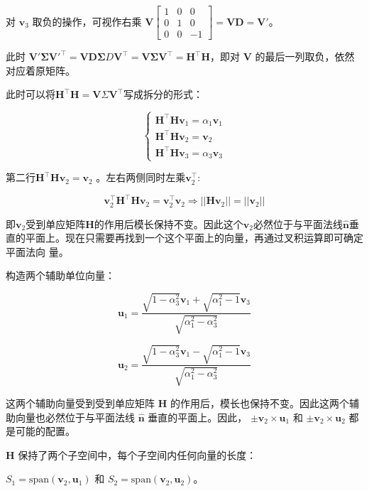 \documentclass{article}
\begin{document}
对 $\mathbf{v}_3$ 取负的操作，可视作右乘 $\mathbf{V}\begin{bmatrix}1&0&0\\0&1&0\\0&0&-1\end{bmatrix}=\mathbf{VD}=\mathbf{V'}$。

此时 $\mathbf{V'}\mathbf{\Sigma}\mathbf{V'}^\top=\mathbf{VD}\mathbf{\Sigma}D\mathbf{V}^\top=\mathbf{V}\mathbf{\Sigma}\mathbf{V}^\top=\mathbf{H}^\top\mathbf{H}$，即对 $\mathbf{V}$ 的最后一列取负，依然对应着原矩阵。

此时可以将$\mathbf{H}^\top\mathbf{H}=\mathbf{V}\Sigma\mathbf{V}^\top$写成拆分的形式：

$$\begin{cases}\mathbf{H}^\top\mathbf{H}\mathbf{v}_1=\alpha_1\mathbf{v}_1\\\mathbf{H}^\top\mathbf{H}\mathbf{v}_2=\mathbf{v}_2\\\mathbf{H}^\top\mathbf{H}\mathbf{v}_3=\alpha_3\mathbf{v}_3\end{cases}$$

第二行$\mathbf{H}^\top\mathbf{H}\mathbf{v}_2=\mathbf{v}_2$ 。左右两侧同时左乘$\mathbf{v}_2^\top:$

$$\mathbf{v}_2^\top\mathbf{H}^\top\mathbf{H}\mathbf{v}_2=\mathbf{v}_2^\top\mathbf{v}_2\Rightarrow||\mathbf{H}\mathbf{v}_2||=||\mathbf{v}_2||$$

即$\mathbf{v}_{2}$受到单应矩阵$\mathbf{H}$的作用后模长保持不变。因此这个$\mathbf{v}_{2}$必然位于与平面法线$\hat{\mathbf{n}}$垂直的平面上。现在只需要再找到一个这个平面上的向量，再通过叉积运算即可确定平面法向
量。

构造两个辅助单位向量：

 $$
\mathbf{u}_{1}=\frac{\sqrt{1-\alpha_{3}^{2}}\mathbf{v}_{1}+\sqrt{\alpha_{1}^{2}-1}\mathbf{v}_{3}}{\sqrt{\alpha_{1}^{2}-\alpha_{3}^{2}}} $$

$$
\mathbf{u}_{2}=\frac{\sqrt{1-\alpha_{3}^{2}}\mathbf{v}_{1}-\sqrt{\alpha_{1}^{2}-1}\mathbf{v}_{3}}{\sqrt{\alpha_{1}^{2}-\alpha_{3}^{2}}}
$$

这两个辅助向量受到受到单应矩阵 $\mathbf{H}$ 的作用后，模长也保持不变。因此这两个辅助向量也必然位于与平面法线 $\hat{\mathbf{n}}$ 垂直的平面上。因此， $\pm\mathbf{v}_{2}\times\mathbf{u}_{1}$ 和 $\pm\mathbf{v}_{2}\times\mathbf{u}_{2}$ 都是可能的配置。

$\mathbf{H}$ 保持了两个子空间中，每个子空间内任何向量的长度：

$S_{1}=\text{span}(\mathbf{v}_{2},\mathbf{u}_{1})$ 和 $S_{2}=\text{span}(\mathbf{v}_{2},\mathbf{u}_{2})$。
\end{document}
